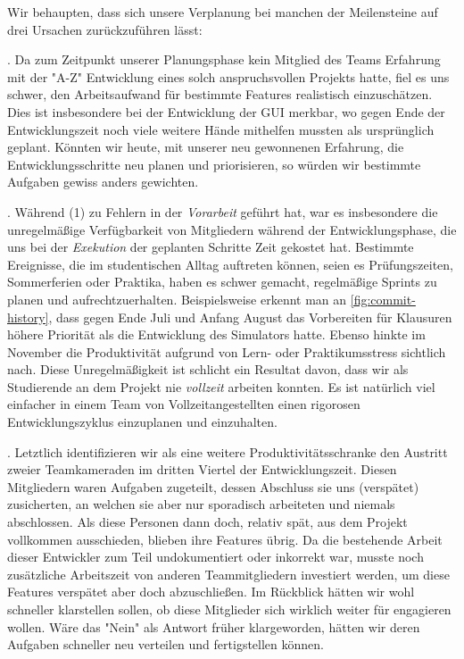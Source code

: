 \pagebreak
Wir behaupten, dass sich unsere Verplanung bei manchen der Meilensteine auf drei Ursachen zurückzuführen lässt:
\begin{senumerate}{-0.2cm}

  . Da zum Zeitpunkt
  unserer Planungsphase kein Mitglied des Teams Erfahrung mit der "A-Z"
  Entwicklung eines solch anspruchsvollen Projekts hatte, fiel es uns schwer,
  den Arbeitsaufwand für bestimmte Features realistisch einzuschätzen. Dies ist
  insbesondere bei der Entwicklung der GUI merkbar, wo gegen Ende der
  Entwicklungszeit noch viele weitere Hände mithelfen mussten als ursprünglich
  geplant. Könnten wir heute, mit unserer neu gewonnenen Erfahrung, die
  Entwicklungsschritte neu planen und priorisieren, so würden wir bestimmte
  Aufgaben gewiss anders gewichten.

  . Während (1) zu Fehlern in der
  \emph{Vorarbeit} geführt hat, war es insbesondere die unregelmäßige
  Verfügbarkeit von Mitgliedern während der Entwicklungsphase, die uns bei der
  \emph{Exekution} der geplanten Schritte Zeit gekostet hat. Bestimmte
  Ereignisse, die im studentischen Alltag auftreten können, seien es
  Prüfungszeiten, Sommerferien oder Praktika, haben es schwer gemacht,
  regelmäßige Sprints zu planen und aufrechtzuerhalten. Beispielsweise erkennt
  man an \autoref{fig:commit-history}, dass gegen Ende Juli und Anfang August
  das Vorbereiten für Klausuren höhere Priorität als die Entwicklung des
  Simulators hatte. Ebenso hinkte im November die Produktivität aufgrund von
  Lern- oder Praktikumsstress sichtlich nach. Diese Unregelmäßigkeit ist
  schlicht ein Resultat davon, dass wir als Studierende an dem Projekt nie
  \emph{vollzeit} arbeiten konnten. Es ist natürlich viel einfacher in einem
  Team von Vollzeitangestellten einen rigorosen Entwicklungszyklus einzuplanen
  und einzuhalten.

  . Letztlich identifizieren wir als eine
  weitere Produktivitätsschranke den Austritt zweier Teamkameraden im dritten
  Viertel der Entwicklungszeit. Diesen Mitgliedern waren Aufgaben zugeteilt,
  dessen Abschluss sie uns (verspätet) zusicherten, an welchen sie aber nur
  sporadisch arbeiteten und niemals abschlossen. Als diese Personen dann doch,
  relativ spät, aus dem Projekt vollkommen ausschieden, blieben ihre Features
  übrig. Da die bestehende Arbeit dieser Entwickler zum Teil undokumentiert oder
  inkorrekt war, musste noch zusätzliche Arbeitszeit von anderen Teammitgliedern
  investiert werden, um diese Features verspätet aber doch abzuschließen. Im
  Rückblick hätten wir wohl schneller klarstellen sollen, ob diese Mitglieder
  sich wirklich weiter für \erasim{} engagieren wollen. Wäre das "Nein" als
  Antwort früher klargeworden, hätten wir deren Aufgaben schneller neu verteilen
  und fertigstellen können.
  \vspace{-0.5cm}
\end{senumerate}
